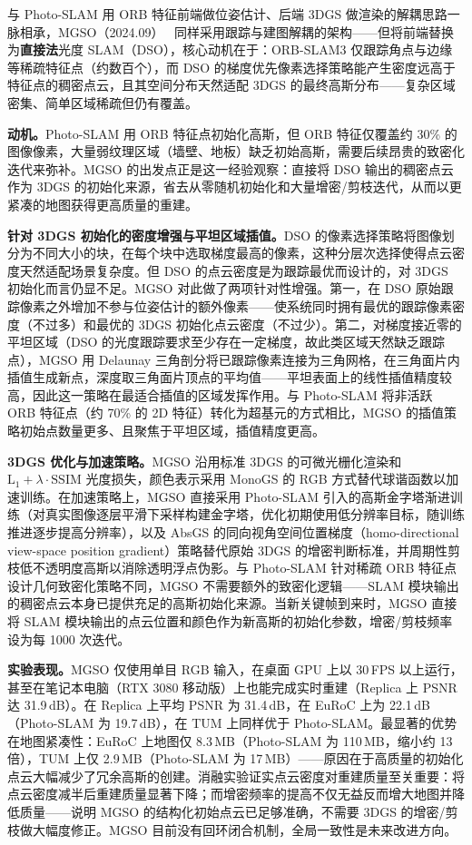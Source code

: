 与 Photo-SLAM 用 ORB 特征前端做位姿估计、后端 3DGS 做渲染的解耦思路一脉相承，MGSO（2024.09）~\cite{2409_13055} 同样采用跟踪与建图解耦的架构——但将前端替换为\textbf{直接法}光度 SLAM（DSO），核心动机在于：ORB-SLAM3 仅跟踪角点与边缘等稀疏特征点（约数百个），而 DSO 的梯度优先像素选择策略能产生密度远高于特征点的稠密点云，且其空间分布天然适配 3DGS 的最终高斯分布——复杂区域密集、简单区域稀疏但仍有覆盖。

\textbf{动机。}Photo-SLAM 用 ORB 特征点初始化高斯，但 ORB 特征仅覆盖约 30\% 的图像像素，大量弱纹理区域（墙壁、地板）缺乏初始高斯，需要后续昂贵的致密化迭代来弥补。MGSO 的出发点正是这一经验观察：直接将 DSO 输出的稠密点云作为 3DGS 的初始化来源，省去从零随机初始化和大量增密/剪枝迭代，从而以更紧凑的地图获得更高质量的重建。

\textbf{针对 3DGS 初始化的密度增强与平坦区域插值。}DSO 的像素选择策略将图像划分为不同大小的块，在每个块中选取梯度最高的像素，这种分层次选择使得点云密度天然适配场景复杂度。但 DSO 的点云密度是为跟踪最优而设计的，对 3DGS 初始化而言仍显不足。MGSO 对此做了两项针对性增强。第一，在 DSO 原始跟踪像素之外增加不参与位姿估计的额外像素——使系统同时拥有最优的跟踪像素密度（不过多）和最优的 3DGS 初始化点云密度（不过少）。第二，对梯度接近零的平坦区域（DSO 的光度跟踪要求至少存在一定梯度，故此类区域天然缺乏跟踪点），MGSO 用 Delaunay 三角剖分将已跟踪像素连接为三角网格，在三角面片内插值生成新点，深度取三角面片顶点的平均值——平坦表面上的线性插值精度较高，因此这一策略在最适合插值的区域发挥作用。与 Photo-SLAM 将非活跃 ORB 特征点（约 70\% 的 2D 特征）转化为超基元的方式相比，MGSO 的插值策略初始点数量更多、且聚焦于平坦区域，插值精度更高。

\textbf{3DGS 优化与加速策略。}MGSO 沿用标准 3DGS 的可微光栅化渲染和 $\mathrm{L}_1 + \lambda \cdot \mathrm{SSIM}$ 光度损失，颜色表示采用 MonoGS 的 RGB 方式替代球谐函数以加速训练。在加速策略上，MGSO 直接采用 Photo-SLAM 引入的高斯金字塔渐进训练（对真实图像逐层平滑下采样构建金字塔，优化初期使用低分辨率目标，随训练推进逐步提高分辨率），以及 AbsGS 的同向视角空间位置梯度（homo-directional view-space position gradient）策略替代原始 3DGS 的增密判断标准，并周期性剪枝低不透明度高斯以消除透明浮点伪影。与 Photo-SLAM 针对稀疏 ORB 特征点设计几何致密化策略不同，MGSO 不需要额外的致密化逻辑——SLAM 模块输出的稠密点云本身已提供充足的高斯初始化来源。当新关键帧到来时，MGSO 直接将 SLAM 模块输出的点云位置和颜色作为新高斯的初始化参数，增密/剪枝频率设为每 1000 次迭代。

\textbf{实验表现。}MGSO 仅使用单目 RGB 输入，在桌面 GPU 上以 30\,FPS 以上运行，甚至在笔记本电脑（RTX 3080 移动版）上也能完成实时重建（Replica 上 PSNR 达 31.9\,dB）。在 Replica 上平均 PSNR 为 31.4\,dB，在 EuRoC 上为 22.1\,dB（Photo-SLAM 为 19.7\,dB），在 TUM 上同样优于 Photo-SLAM。最显著的优势在地图紧凑性：EuRoC 上地图仅 8.3\,MB（Photo-SLAM 为 110\,MB，缩小约 13 倍），TUM 上仅 2.9\,MB（Photo-SLAM 为 17\,MB）——原因在于高质量的初始化点云大幅减少了冗余高斯的创建。消融实验证实点云密度对重建质量至关重要：将点云密度减半后重建质量显著下降；而增密频率的提高不仅无益反而增大地图并降低质量——说明 MGSO 的结构化初始点云已足够准确，不需要 3DGS 的增密/剪枝做大幅度修正。MGSO 目前没有回环闭合机制，全局一致性是未来改进方向。

